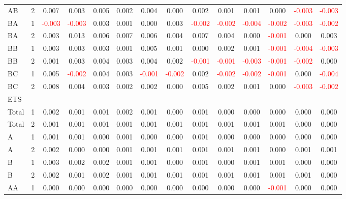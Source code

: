 \begin{table}[H]
{\begin{tabular}{llcccccccccccc}
AB & 2 & 0.007 & 0.003 & 0.005 & 0.002 & 0.004 & 0.000 & 0.002 & 0.001 & 0.001 & 0.000 & \textcolor{red}{-0.003} & \textcolor{red}{-0.003}\\
BA & 1 & \textcolor{red}{-0.003} & \textcolor{red}{-0.003} & 0.003 & 0.001 & 0.000 & 0.003 & \textcolor{red}{-0.002} & \textcolor{red}{-0.002} & \textcolor{red}{-0.004} & \textcolor{red}{-0.002} & \textcolor{red}{-0.003} & \textcolor{red}{-0.002}\\
BA & 2 & 0.003 & 0.013 & 0.006 & 0.007 & 0.006 & 0.004 & 0.007 & 0.004 & 0.000 & \textcolor{red}{-0.001} & 0.000 & 0.003\\
BB & 1 & 0.003 & 0.003 & 0.003 & 0.001 & 0.005 & 0.001 & 0.000 & 0.002 & 0.001 & \textcolor{red}{-0.001} & \textcolor{red}{-0.004} & \textcolor{red}{-0.003}\\
BB & 2 & 0.001 & 0.003 & 0.004 & 0.003 & 0.004 & 0.002 & \textcolor{red}{-0.001} & \textcolor{red}{-0.001} & \textcolor{red}{-0.003} & \textcolor{red}{-0.001} & \textcolor{red}{-0.002} & 0.000\\
BC & 1 & 0.005 & \textcolor{red}{-0.002} & 0.004 & 0.003 & \textcolor{red}{-0.001} & \textcolor{red}{-0.002} & 0.002 & \textcolor{red}{-0.002} & \textcolor{red}{-0.002} & \textcolor{red}{-0.001} & 0.000 & \textcolor{red}{-0.004}\\
BC & 2 & 0.008 & 0.004 & 0.003 & 0.002 & 0.002 & 0.000 & 0.005 & 0.002 & 0.001 & 0.000 & \textcolor{red}{-0.003} & \textcolor{red}{-0.002}\\
\hline
ETS &  &  &  &  &  &  &  &  &  &  &  &  & \\
\hline
Total & 1 & 0.002 & 0.001 & 0.001 & 0.002 & 0.001 & 0.000 & 0.001 & 0.000 & 0.000 & 0.000 & 0.000 & 0.000\\
Total & 2 & 0.001 & 0.001 & 0.001 & 0.001 & 0.001 & 0.001 & 0.001 & 0.001 & 0.001 & 0.001 & 0.000 & 0.000\\
A & 1 & 0.001 & 0.001 & 0.000 & 0.001 & 0.000 & 0.000 & 0.001 & 0.000 & 0.000 & 0.000 & 0.000 & 0.000\\
A & 2 & 0.002 & 0.000 & 0.000 & 0.001 & 0.001 & 0.001 & 0.001 & 0.001 & 0.001 & 0.000 & 0.001 & 0.001\\
B & 1 & 0.003 & 0.002 & 0.002 & 0.001 & 0.001 & 0.000 & 0.001 & 0.000 & 0.001 & 0.001 & 0.000 & 0.000\\
B & 2 & 0.002 & 0.001 & 0.002 & 0.001 & 0.001 & 0.001 & 0.001 & 0.001 & 0.001 & 0.001 & 0.001 & 0.000\\
AA & 1 & 0.000 & 0.000 & 0.000 & 0.000 & 0.000 & 0.000 & 0.000 & 0.000 & 0.000 & \textcolor{red}{-0.001} & 0.000 & 0.000\\

\end{tabular}}
\end{table}
